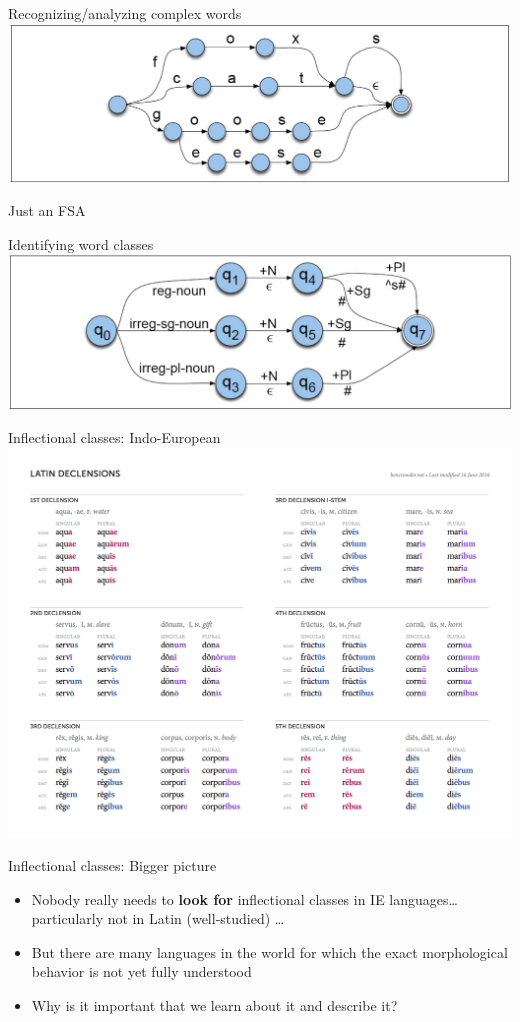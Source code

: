 \documentclass{beamer}
\begin{document}
\begin{frame}{Recognizing/analyzing complex words}
  \includegraphics[width=\textwidth]{figures/3-7}

  Just an FSA
\end{frame}

\begin{frame}{Identifying word classes}
  \includegraphics[width=\textwidth]{figures/3-13}
\end{frame}

\begin{frame}{Inflectional classes: Indo-European}
  \includegraphics[width=\textwidth]{figures/latin-declensions}
\end{frame}

\begin{frame}{Inflectional classes: Bigger picture}
  \begin{itemize}
  \item Nobody really needs to {\bf look for} inflectional classes in
    IE languages\ldots particularly not in Latin (well-studied) \ldots
  \item But there are many languages in the world for which the exact
    morphological behavior is not yet fully understood
  \item Why is it important that we learn about it and describe it?
  \end{itemize}
\end{frame}
\end{document}
